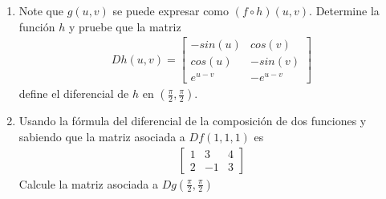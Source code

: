 \documentclass[letterpaper,11pt]{article}
\begin{document}
\begin{enumerate}
\begin{enumerate}
    \item Note que $g(u,v)$ se puede expresar como $(f \circ h)(u,v)$. Determine la función $h$ y pruebe que la matriz
    \begin{align*}
        Dh(u,v)=\begin{bmatrix}
            -sin(u) & cos(v) \\
            cos(u) & -sin(v) \\
            e^{u-v} & -e^{u-v} 
        \end{bmatrix}
    \end{align*}
    define el diferencial de $h$ en $(\frac{\pi}{2},\frac{\pi}{2})$.
    \item Usando la fórmula del diferencial de la composición de dos funciones y sabiendo que la matriz asociada a $Df(1,1,1)$ es
    \begin{align*}
        \begin{bmatrix}
        1 & 3 & 4 \\
        2 & -1 & 3
        \end{bmatrix}
    \end{align*}
    Calcule la matriz asociada a $Dg(\frac{\pi}{2},\frac{\pi}{2})$
\end{enumerate}

\end{enumerate}
\end{document}
